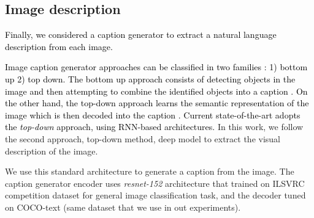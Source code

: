 \documentclass[phd,tocprelim]{cornell}
\begin{document}
\subsection{Image description}

\textcolor{black}{Finally, we considered a caption generator to extract a natural language description from each image.}   


\textcolor{black}{Image caption generator approaches can be classified in two families : 1) bottom up 2) top down. The bottom up approach consists of detecting objects in the image and then attempting to combine the identified objects into a caption \cite{vinyals2015show}. On the other hand, the top-down approach learns the semantic representation of the image which is then decoded into the caption \cite{karpathy2015deep}. Current state-of-the-art adopts the \textit{top-down} approach, using RNN-based architectures.}
In this work, we follow the second approach, top-down method, deep model to extract the visual description of the image. %




We use this standard architecture \cite{vinyals2015show} to generate a caption from the image. The caption generator encoder uses \textit{resnet-152} architecture \cite{he2016deep} that trained on ILSVRC competition dataset for general image classification task, and the decoder tuned on COCO-text (same dataset that we use in out experiments). 
\end{document}
